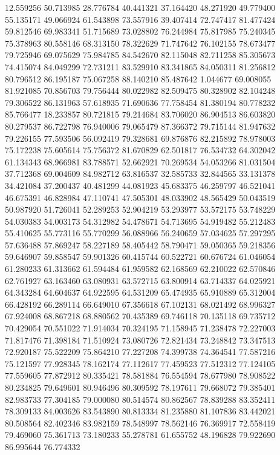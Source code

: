 12.559256
50.713985
28.776784
40.441321
37.164420
48.271920
49.779400
55.135171
49.066924
61.543898
73.557916
39.407414
72.747417
81.477424
59.812546
69.983341
51.715689
73.028802
76.244984
75.817985
75.240345
75.378963
80.558146
68.313150
78.322629
71.747642
76.102155
78.673477
79.725946
69.075629
75.984785
84.542670
82.115048
82.711258
85.305673
74.415074
84.049299
72.731211
83.529910
83.341865
84.050311
81.256812
80.796512
86.195187
75.067258
88.140210
85.487642
1.044677
69.008055
81.921085
70.856703
79.756444
80.022982
82.509475
80.328902
82.104248
79.306522
86.131963
57.618935
71.690636
77.758454
81.380194
80.778232
85.766477
18.233857
80.721815
79.214684
83.706020
86.904513
86.603820
80.279537
86.722798
76.940006
79.065479
87.366372
79.715144
81.947632
79.226155
77.593506
56.092419
79.328681
69.876876
82.215892
78.978003
75.172238
75.605614
75.756372
81.670829
62.501817
76.534732
64.302042
61.134343
68.966981
83.788571
52.662921
70.269534
54.053266
81.031504
37.712368
69.004609
84.982712
63.816537
32.585733
32.844565
33.131378
34.421084
37.200437
40.481299
44.081923
45.683375
46.259797
46.521041
46.675391
46.828984
47.110741
47.505301
48.033902
48.565429
50.043519
50.987920
51.726041
52.289253
52.904219
53.293977
53.572175
53.748229
54.030383
54.003173
54.312982
54.478671
54.713695
54.919482
55.212483
55.410625
55.773116
55.770299
56.088966
56.240659
57.034625
57.297295
57.636488
57.869247
58.227189
58.405442
58.790471
59.050365
59.218356
59.646907
59.858547
59.901326
60.415744
60.522721
60.676724
61.046054
61.280233
61.313662
61.594484
61.959582
62.168569
62.210022
62.570846
62.761927
63.163460
63.080931
63.572715
63.800914
63.714337
64.025921
64.343284
64.604637
64.922595
64.531209
65.474935
65.910889
65.312004
66.428192
66.289114
66.649010
67.356618
67.102131
68.021492
68.996327
67.924008
68.867218
68.880562
70.435389
69.746118
70.135118
69.735712
70.429054
70.551022
71.914034
70.324195
71.158945
71.238478
72.227003
71.817476
71.398184
71.510924
73.080726
72.821434
73.248842
73.347513
72.920187
75.522209
75.864210
77.227208
74.399738
74.364541
77.587216
75.121597
77.928345
78.162174
77.112617
77.459523
77.512312
77.124105
77.559605
77.872912
80.335421
78.581884
76.554594
78.677980
78.908522
80.234825
79.649601
80.946496
80.309592
78.197611
79.668072
79.385401
82.983733
77.304185
79.000080
80.514574
80.862567
78.839288
83.352411
78.309133
84.003626
83.543890
80.813334
81.235880
81.107836
83.442021
80.508564
82.402346
83.982159
78.548997
78.562146
76.369917
72.558419
79.469060
75.361713
73.180233
55.278781
61.655752
48.196828
79.922690
86.995644
76.774332
